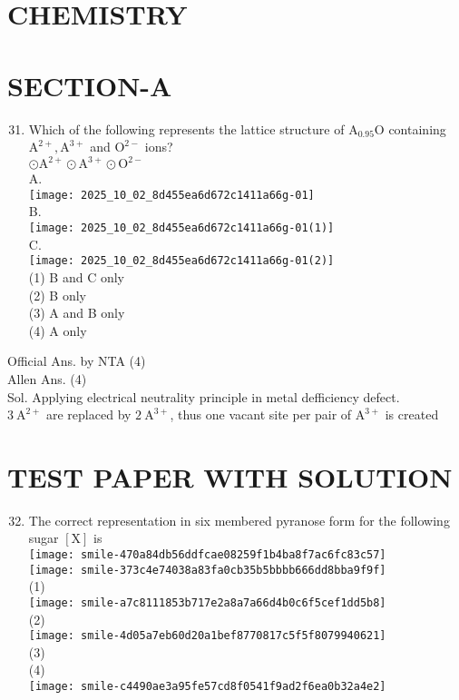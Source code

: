 \documentclass[10pt]{article}
\begin{document}
\captionsetup{singlelinecheck=false}
\section*{CHEMISTRY}
\section*{SECTION-A}
\begin{enumerate}
  \setcounter{enumi}{30}
  \item Which of the following represents the lattice structure of \(\mathrm{A}_{0.95} \mathrm{O}\) containing \(\mathrm{A}^{2+}, \mathrm{A}^{3+}\) and \(\mathrm{O}^{2-}\) ions?\\
\(\odot \mathrm{A}^{2+} \odot \mathrm{A}^{3+} \odot \mathrm{O}^{2-}\)\\
A.\\
\texttt{[image: 2025\_10\_02\_8d455ea6d672c1411a66g-01]}\\
B.\\
\texttt{[image: 2025\_10\_02\_8d455ea6d672c1411a66g-01(1)]}\\
C.\\
\texttt{[image: 2025\_10\_02\_8d455ea6d672c1411a66g-01(2)]}\\
(1) B and C only\\
(2) B only\\
(3) A and B only\\
(4) A only
\end{enumerate}

Official Ans. by NTA (4)\\
Allen Ans. (4)\\
Sol. Applying electrical neutrality principle in metal defficiency defect.\\
\(3 \mathrm{~A}^{2+}\) are replaced by \(2 \mathrm{~A}^{3+}\), thus one vacant site per pair of \(\mathrm{A}^{3+}\) is created

\section*{TEST PAPER WITH SOLUTION}
\begin{enumerate}
  \setcounter{enumi}{31}
  \item The correct representation in six membered pyranose form for the following sugar \([\mathrm{X}]\) is\\
\texttt{[image: smile-470a84db56ddfcae08259f1b4ba8f7ac6fc83c57]}\\
\texttt{[image: smile-373c4e74038a83fa0cb35b5bbbb666dd8bba9f9f]}\\
(1)\\
\texttt{[image: smile-a7c8111853b717e2a8a7a66d4b0c6f5cef1dd5b8]}\\
(2)\\
\texttt{[image: smile-4d05a7eb60d20a1bef8770817c5f5f8079940621]}\\
(3)\\
(4)\\
\texttt{[image: smile-c4490ae3a95fe57cd8f0541f9ad2f6ea0b32a4e2]}
\end{enumerate}
\end{document}
